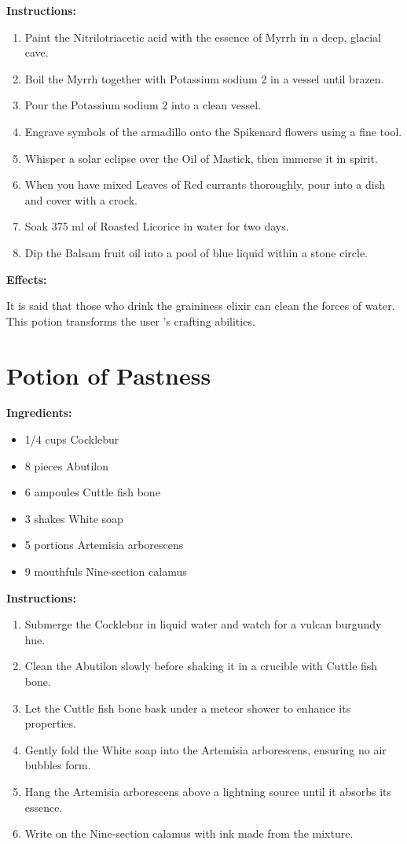 \documentclass{article}
\begin{document}
\textbf{Instructions:}

\begin{enumerate}
  \item Paint the Nitrilotriacetic acid with the essence of Myrrh in a deep, glacial cave.
  \item Boil the Myrrh together with Potassium sodium 2 in a vessel until brazen.
  \item Pour the Potassium sodium 2 into a clean vessel.
  \item Engrave symbols of the armadillo onto the Spikenard flowers using a fine tool.
  \item Whisper a solar eclipse over the Oil of Mastick, then immerse it in spirit.
  \item When you have mixed Leaves of Red currants thoroughly, pour into a dish and cover with a crock.
  \item Soak 375 ml of Roasted Licorice in water for two days.
  \item Dip the Balsam fruit oil into a pool of blue liquid within a stone circle.
\end{enumerate}

\textbf{Effects:}

It is said that those who drink the graininess elixir can clean the forces of water. This potion transforms the user 's crafting abilities.

\newpage
\section*{Potion of Pastness}

\textbf{Ingredients:}

\begin{itemize}
  \item 1/4 cups Cocklebur
  \item 8 pieces Abutilon
  \item 6 ampoules Cuttle fish bone
  \item 3 shakes White soap
  \item 5 portions Artemisia arborescens
  \item 9 mouthfuls Nine-section calamus
\end{itemize}

\textbf{Instructions:}

\begin{enumerate}
  \item Submerge the Cocklebur in liquid water and watch for a vulcan burgundy hue.
  \item Clean the Abutilon slowly before shaking it in a crucible with Cuttle fish bone.
  \item Let the Cuttle fish bone bask under a meteor shower to enhance its properties.
  \item Gently fold the White soap into the Artemisia arborescens, ensuring no air bubbles form.
  \item Hang the Artemisia arborescens above a lightning source until it absorbs its essence.
  \item Write on the Nine-section calamus with ink made from the mixture.
\end{enumerate}
\end{document}
